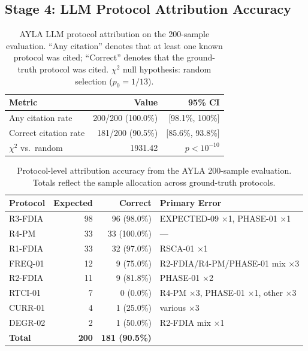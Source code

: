 \documentclass[twocolumn, 10pt, letterpaper]{article}
\begin{document}
\subsection{Stage 4: LLM Protocol Attribution Accuracy}

\begin{table}[H]
\centering
\caption{AYLA LLM protocol attribution on the 200-sample evaluation.
         ``Any citation'' denotes that at least one known protocol was cited;
         ``Correct'' denotes that the ground-truth protocol was cited.
         $\chi^2$ null hypothesis: random selection ($p_0{=}1/13$).}
\label{tab:llm}
\small
\begin{tabular}{lrr}
\toprule
\textbf{Metric} & \textbf{Value} & \textbf{95\% CI} \\
\midrule
Any citation rate    & 200/200 (100.0\%) & [98.1\%, 100\%] \\
Correct citation rate & 181/200 (90.5\%) & [85.6\%, 93.8\%] \\
$\chi^2$ vs.\ random & 1931.42 & $p < 10^{-10}$ \\
\bottomrule
\end{tabular}
\end{table}

\begin{table}[t]
\centering
\caption{Protocol-level attribution accuracy from the AYLA 200-sample evaluation.
         Totals reflect the sample allocation across ground-truth protocols.}
\label{tab:proto_acc}
\begin{tabular}{lrrl}
\toprule
\textbf{Protocol} & \textbf{Expected} & \textbf{Correct} & \textbf{Primary Error} \\
\midrule
R3-FDIA     & 98  & 96 (98.0\%)  & EXPECTED-09 $\times$1, PHASE-01 $\times$1 \\
R4-PM       & 33  & 33 (100.0\%) & --- \\
R1-FDIA     & 33  & 32 (97.0\%)  & RSCA-01 $\times$1 \\
FREQ-01     & 12  & 9  (75.0\%)  & R2-FDIA/R4-PM/PHASE-01 mix $\times$3 \\
R2-FDIA     & 11  & 9  (81.8\%)  & PHASE-01 $\times$2 \\
RTCI-01     & 7   & 0  (0.0\%)   & R4-PM $\times$3, PHASE-01 $\times$1, other $\times$3 \\
CURR-01     & 4   & 1  (25.0\%)  & various $\times$3 \\
DEGR-02     & 2   & 1  (50.0\%)  & R2-FDIA mix $\times$1 \\
\midrule
\textbf{Total} & \textbf{200} & \textbf{181 (90.5\%)} & \\
\bottomrule
\end{tabular}
\end{table}
\end{document}
